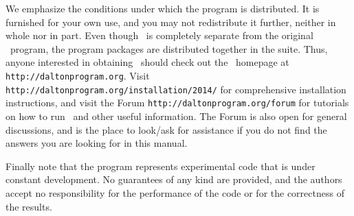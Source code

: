 \vspace{0.5 cm}

We emphasize the conditions under which the
program is distributed.  It is furnished for your own use,
and you may not redistribute it further, neither in whole nor in
part.  Even though \lsdalton\ is completely separate from the original
\dalton\ program, the program packages are distributed together in the
{\latestrelease} suite. Thus, 
anyone interested in obtaining \lsdalton\ should check out the
\dalton\ homepage at
\verb|http://daltonprogram.org|. Visit \verb|http://daltonprogram.org/installation/2014/|
for comprehensive installation instructions, and visit the Forum
\verb|http://daltonprogram.org/forum| for 
tutorials on how to run \lsdalton\ and other 
useful information. The Forum is also open for general discussions, and 
is the place to look/ask for assistance if you do not find the answers 
you are looking for in this manual.

Finally note that the
program represents experimental code that is
under constant development.  No guarantees of any kind are
provided, and the authors accept no responsibility for the
performance of the code or for the correctness of the results.

